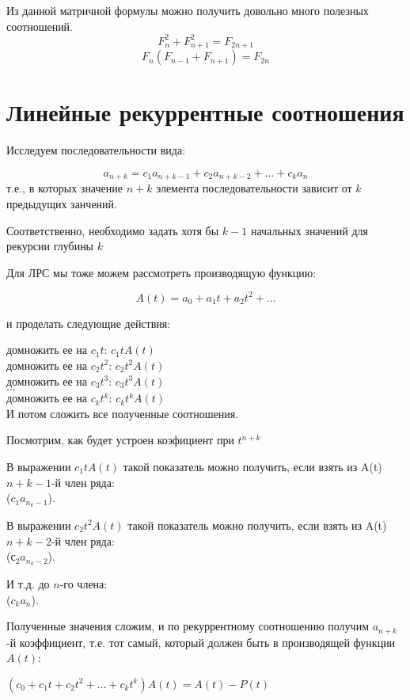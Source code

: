 Из данной матричной формулы можно получить довольно много полезных соотношений.
$$
F_{n}^{2} + F_{n+1}^{2}  = F_{2n+1}
$$
$$
F_{n}( F_{n-1} + F_{n+1} )= F_{2n}
$$

\section{Линейные рекуррентные соотношения}

Исследуем последовательности вида:

$$
a_{n+k} = c_1 a_{n+k-1} + c_2 a_{n+k-2} + \ldots + c_k a_n
$$
т.е., в которых значение $ n+k $ элемента последовательности 
зависит от $ k $ предыдущих занчений.

Соответственно, необходимо задать хотя бы $ k-1 $ 
начальных значений для рекурсии глубины $ k $

Для ЛРС мы тоже можем рассмотреть производящую функцию:

$$
A(t) = a_0 + a_1 t + a_2 t^2 + \ldots
$$

и проделать следующие действия:

домножить ее на $c_1 t$: $ c_1 t A(t) $ \\
домножить ее на $c_2 t^2$: $ c_2 t^{2} A(t) $ \\
домножить ее на $c_3 t^3$: $ c_3 t^{3} A(t) $ \\
$\ldots$ \\
домножить ее на $c_{k} t^{k}$: $ c_k t^{k} A(t) $ \\

И потом сложить все полученные соотношения.

Посмотрим, как будет устроен коэфициент при $ t^{n+k} $

В выражении $ c_1 t A(t) $ такой показатель можно получить, 
если взять из A(t) $ n+k-1$-й член ряда: \\
($ c_{1} a_{n_k-1} $).

В выражении $ c_2 t^{2} A(t)$ такой показатель можно получить, 
если взять из A(t) $ n+k-2$-й член ряда: \\
($ с_{2} a_{n_k-2} $).

И т.д. до $ n$-го члена: \\
($ c_{k} a_{n} $).

Полученные значения сложим, и по рекуррентному соотношению 
получим $ a_{n+k}$-й коэффициент, т.е. тот самый, который должен быть 
в производящей функции $ A(t) $:

$(c_0 + c_1 t + c_2 t^2 + \ldots + c_k t^k) A(t) = A(t) - P(t)$

